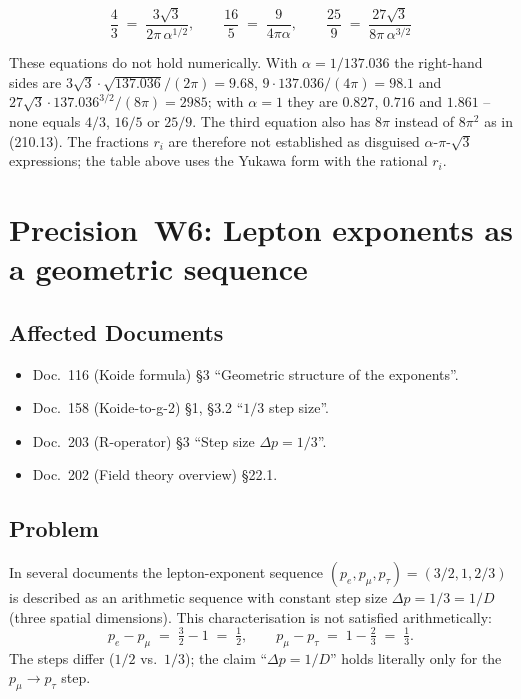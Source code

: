 \begin{equation}
  \frac{4}{3} \;=\; \frac{3\sqrt{3}}{2\pi\,\alpha^{1/2}},
  \qquad
  \frac{16}{5} \;=\; \frac{9}{4\pi\alpha},
  \qquad
  \frac{25}{9} \;=\; \frac{27\sqrt{3}}{8\pi\,\alpha^{3/2}}
  \tag{210.8}
\end{equation}

These equations do not hold numerically. With $\alpha = 1/137.036$ the right-hand sides are $3\sqrt3\cdot\sqrt{137.036}/(2\pi) = 9.68$, $9\cdot137.036/(4\pi) = 98.1$ and $27\sqrt3\cdot137.036^{3/2}/(8\pi) = 2985$; with $\alpha = 1$ they are $0.827$, $0.716$ and $1.861$ -- none equals $4/3$, $16/5$ or $25/9$. The third equation also has $8\pi$ instead of $8\pi^2$ as in (210.13). The fractions $r_i$ are therefore not established as disguised $\alpha$-$\pi$-$\sqrt3$ expressions; the table above uses the Yukawa form with the rational $r_i$.

\section{\texorpdfstring{Precision~W6: Lepton exponents as a geometric sequence}{Precision W6: Lepton exponents as a geometric sequence}}

\subsection*{Affected Documents}

\begin{itemize}[leftmargin=2em,itemsep=2pt,topsep=2pt]
  \item Doc.~116 (Koide formula) §3 \enquote{Geometric structure of
        the exponents}.
  \item Doc.~158 (Koide-to-g-2) §1, §3.2 \enquote{$1/3$ step size}.
  \item Doc.~203 (R-operator) §3 \enquote{Step size $\Delta p = 1/3$}.
  \item Doc.~202 (Field theory overview) §22.1.
\end{itemize}

\subsection*{Problem}

In several documents the lepton-exponent sequence
$(p_e, p_\mu, p_\tau) = (3/2, 1, 2/3)$ is described as an arithmetic
sequence with constant step size $\Delta p = 1/3 = 1/D$ (three spatial
dimensions). This characterisation is not satisfied arithmetically:
\begin{equation}
  p_e - p_\mu \;=\; \tfrac{3}{2} - 1 \;=\; \tfrac{1}{2},
  \qquad
  p_\mu - p_\tau \;=\; 1 - \tfrac{2}{3} \;=\; \tfrac{1}{3}.
\end{equation}
The steps differ ($1/2$ vs.\ $1/3$); the claim
\enquote{$\Delta p = 1/D$} holds literally only for the
$p_\mu \to p_\tau$ step.

